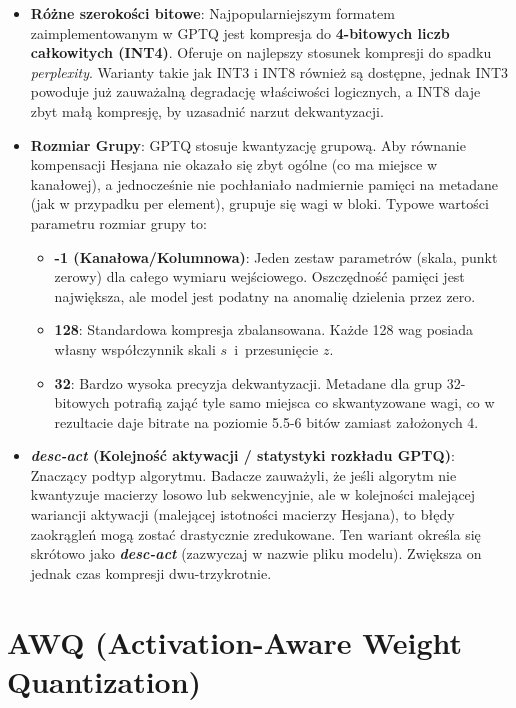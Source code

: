\begin{itemize}
    \item \textbf{Różne szerokości bitowe}: Najpopularniejszym formatem zaimplementowanym w GPTQ jest kompresja do \textbf{4-bitowych liczb całkowitych (INT4)}. Oferuje on najlepszy stosunek kompresji do spadku \textit{perplexity}. Warianty takie jak INT3 i INT8 również są dostępne, jednak INT3 powoduje już zauważalną degradację właściwości logicznych, a INT8 daje zbyt małą kompresję, by uzasadnić narzut dekwantyzacji.
    
    \item \textbf{Rozmiar Grupy}: GPTQ stosuje kwantyzację grupową. Aby równanie kompensacji Hesjana nie okazało się zbyt ogólne (co ma miejsce w kanałowej), a jednocześnie nie pochłaniało nadmiernie pamięci na metadane (jak w przypadku per element), grupuje się wagi w bloki. Typowe wartości parametru rozmiar grupy to:
    \begin{itemize}
        \item \textbf{-1 (Kanałowa/Kolumnowa)}: Jeden zestaw parametrów (skala, punkt zerowy) dla całego wymiaru wejściowego. Oszczędność pamięci jest największa, ale model jest podatny na anomalię dzielenia przez zero.
        \item \textbf{128}: Standardowa kompresja zbalansowana. Każde 128 wag posiada własny współczynnik skali $s$~i~przesunięcie $z$.
        \item \textbf{32}: Bardzo wysoka precyzja dekwantyzacji. Metadane dla grup 32-bitowych potrafią zająć tyle samo miejsca co skwantyzowane wagi, co w rezultacie daje bitrate na poziomie 5.5-6 bitów zamiast założonych 4.
    \end{itemize}
    
    \item \textbf{\textit{desc-act} (Kolejność aktywacji / statystyki rozkładu GPTQ)}: Znaczący podtyp algorytmu. Badacze zauważyli, że jeśli algorytm nie kwantyzuje macierzy losowo lub sekwencyjnie, ale w kolejności malejącej wariancji aktywacji (malejącej istotności macierzy Hesjana), to błędy zaokrągleń mogą zostać drastycznie zredukowane. Ten wariant określa się skrótowo jako \textbf{\textit{desc-act}} (zazwyczaj w nazwie pliku modelu). Zwiększa on jednak czas kompresji dwu-trzykrotnie.
\end{itemize}

\section{AWQ (Activation-Aware Weight Quantization)}

